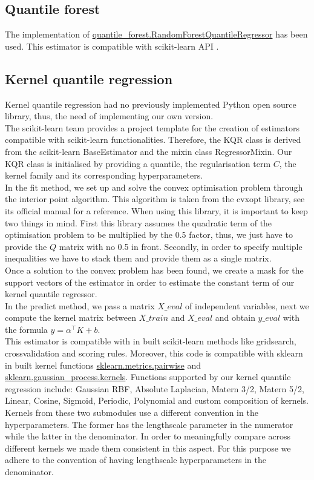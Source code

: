\subsection{Quantile forest}
The implementation of \href{https://pypi.org/project/quantile-forest/}{quantile\_forest.RandomForestQuantileRegressor} has been used. This estimator is compatible with scikit-learn API \cite{Johnson2024}.
\subsection{Kernel quantile regression}
Kernel quantile regression had no previously implemented Python open source library, thus, the need of implementing our own version.
\\
The scikit-learn team provides a project template for the creation of estimators compatible with scikit-learn functionalities. Therefore, the KQR class is derived from the scikit-learn BaseEstimator and the mixin class RegressorMixin.
Our KQR class is initialised by providing a quantile, the regularisation term $C$, the kernel family and its corresponding hyperparameters.
\\
In the fit method, we set up and solve the convex optimisation problem through the interior point algorithm. This algorithm is taken from the cvxopt library, see its official manual  for a reference.
When using this library, it is important to keep two things in mind. First this library assumes the quadratic term of the optimisation problem to be multiplied by the 0.5 factor, thus, we just have to provide the $Q$ matrix with no 0.5 in front.
Secondly, in order to specify multiple inequalities we have to stack them and provide them as a single matrix.
\\
Once a solution to the convex problem has been found, we create a mask for the support vectors of the estimator in order to estimate the constant term of our kernel quantile regressor.
\\
In the predict method, we pass a matrix $X\_eval$ of independent variables, next we compute the kernel matrix between $X\_train$ and $X\_eval$ and obtain $y\_eval$ with the formula $y=\alpha^\intercal K+b$.
\\
This estimator is compatible with in built scikit-learn methods like gridsearch, crossvalidation and scoring rules. Moreover, this code is compatible with sklearn in built kernel functions \href{https://scikit-learn.org/stable/modules/classes.html#module-sklearn.metrics.pairwise}{sklearn.metrics.pairwise} and \href{https://scikit-learn.org/stable/modules/classes.html#module-sklearn.gaussian_process.kernels}{sklearn.gaussian\_process.kernels}. Functions supported by our kernel quantile regression include: Gaussian RBF, Absolute Laplacian, Matern 3/2, Matern 5/2, Linear, Cosine, Sigmoid, Periodic, Polynomial and custom composition of kernels. 
Kernels from these two submodules use a different convention in the hyperparameters. The former has the lengthscale parameter in the numerator while the latter in the denominator. In order to meaningfully compare across different kernels we made them consistent in this aspect. For this purpose we adhere to the convention of having lengthscale hyperparameters in the denominator.

